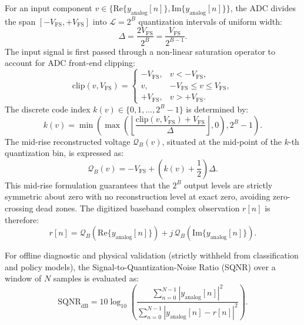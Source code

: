 For an input component $v \in \{ \text{Re}\{y_{\text{analog}}[n]\}, \text{Im}\{y_{\text{analog}}[n]\} \}$, the ADC divides the span $[-V_{\text{FS}}, +V_{\text{FS}}]$ into $\mathcal{L} = 2^B$ quantization intervals of uniform width:
\begin{equation}
\Delta = \frac{2 V_{\text{FS}}}{2^B} = \frac{V_{\text{FS}}}{2^{B-1}}.
\label{eq:adc_step}
\end{equation}
The input signal is first passed through a non-linear saturation operator to account for ADC front-end clipping:
\begin{equation}
\text{clip}(v, V_{\text{FS}}) = \begin{cases}
-V_{\text{FS}}, & v < -V_{\text{FS}}, \\
v, & -V_{\text{FS}} \le v \le V_{\text{FS}}, \\
+V_{\text{FS}}, & v > +V_{\text{FS}}.
\end{cases}
\label{eq:adc_clip}
\end{equation}
The discrete code index $k(v) \in \{0, 1, \dots, 2^B - 1\}$ is determined by:
\begin{equation}
k(v) = \min\left( \max\left( \left\lfloor \frac{\text{clip}(v, V_{\text{FS}}) + V_{\text{FS}}}{\Delta} \right\rfloor, 0 \right), 2^B - 1 \right).
\label{eq:adc_index}
\end{equation}
The mid-rise reconstructed voltage $\mathcal{Q}_B(v)$, situated at the mid-point of the $k$-th quantization bin, is expressed as:
\begin{equation}
\mathcal{Q}_B(v) = -V_{\text{FS}} + \left(k(v) + \frac{1}{2}\right) \Delta.
\label{eq:adc_reconstruct}
\end{equation}
This mid-rise formulation guarantees that the $2^B$ output levels are strictly symmetric about zero with no reconstruction level at exact zero, avoiding zero-crossing dead zones. The digitized baseband complex observation $r[n]$ is therefore:
\begin{equation}
r[n] = \mathcal{Q}_B\left(\text{Re}\{y_{\text{analog}}[n]\}\right) + j \, \mathcal{Q}_B\left(\text{Im}\{y_{\text{analog}}[n]\}\right).
\label{eq:adc_complex_out}
\end{equation}

For offline diagnostic and physical validation (strictly withheld from classification and policy models), the Signal-to-Quantization-Noise Ratio (SQNR) over a window of $N$ samples is evaluated as:
\begin{equation}
\text{SQNR}_{\text{dB}} = 10 \log_{10} \left( \frac{\sum_{n=0}^{N-1} |y_{\text{analog}}[n]|^2}{\sum_{n=0}^{N-1} |y_{\text{analog}}[n] - r[n]|^2} \right).
\label{eq:sqnr_eval}
\end{equation}


